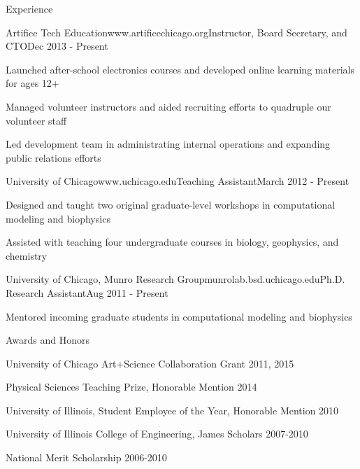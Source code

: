 \documentclass{resume} %
\begin{document}
\begin{rSection}{Experience}



\begin{rSubsection}{Artifice Tech Education}{www.artificechicago.org}{Instructor, Board Secretary, and CTO}{Dec 2013 - Present}
	\item Launched after-school electronics courses and developed online learning materials for ages 12+
	\item Managed volunteer instructors and aided recruiting efforts to quadruple our volunteer staff
	\item Led development team in administrating internal operations and expanding public relations efforts
	
	
\end{rSubsection}


\begin{rSubsection}{University of Chicago}{www.uchicago.edu}{Teaching Assistant}{March 2012 - Present}
	\item Designed and taught two original graduate-level workshops in computational modeling and biophysics 
	\item Assisted with teaching four undergraduate courses in biology, geophysics, and chemistry
	
\end{rSubsection}


\begin{rSubsection}{University of Chicago, Munro Research Group}{munrolab.bsd.uchicago.edu}{Ph.D. Research Assistant}{Aug 2011 - Present}
\item Mentored incoming graduate students in computational modeling and biophysics

\end{rSubsection}


\end{rSection}


\begin{rSection}{Awards and Honors}
	
	\item University of Chicago Art+Science Collaboration Grant 2011, 2015
	\item Physical Sciences Teaching Prize, Honorable Mention 2014
	\item University of Illinois, Student Employee of the Year, Honorable Mention 2010
	\item University of Illinois College of Engineering, James Scholars 2007-2010
	\item National Merit Scholarship 2006-2010
	
\end{rSection}
\end{document}
